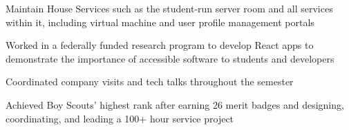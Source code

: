 

\smallskip
\smallskip


\medskip
{}

Maintain House Services such as the student-run server room and all services within it, including virtual machine and user profile management portals

\divider

Worked in a federally funded research program to develop React apps to demonstrate the importance of accessible software to students and developers

\divider

Coordinated company visits and tech talks throughout the semester

\divider

Achieved Boy Scouts' highest rank after earning 26 merit badges and designing, coordinating, and leading a 100+ hour service project

